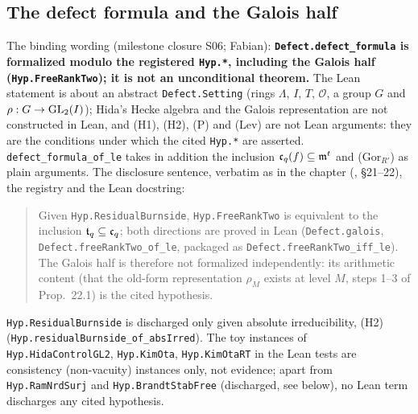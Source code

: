 \subsection{The defect formula and the Galois half}
The binding wording (milestone closure S06; Fabian): \textbf{\texttt{Defect.defect\_formula} is formalized modulo the
registered \texttt{Hyp.*}, including the Galois half (\texttt{Hyp.FreeRankTwo}); it is not an unconditional theorem.}
The Lean statement is about an abstract \texttt{Defect.Setting} (rings $\Lambda$, $I$, $T$, $\mathcal O$, a group $G$ and
$\rho:G\to\mathrm{GL}_2(I)$); Hida's Hecke algebra and the Galois representation are not constructed in Lean, and (H1), (H2), (P)
and (Lev) are not Lean arguments: they are the conditions under which the cited \texttt{Hyp.*} are asserted.
\texttt{defect\_formula\_of\_le} takes in addition the inclusion $\mathfrak{c}_q(f)\subseteq\mathfrak{m}^t$ and (Gor$_{R'}$) as plain arguments.
The disclosure sentence, verbatim as in the chapter (\mainpdf, \S21--22), the registry and the Lean docstring:
\begin{quote}\small
Given \texttt{Hyp.ResidualBurnside}, \texttt{Hyp.FreeRankTwo} is equivalent to the inclusion $\mathfrak{t}_q\subseteq\mathfrak{c}_q$; both
directions are proved in Lean (\texttt{Defect.galois}, \texttt{Defect.freeRankTwo\_of\_le}, packaged as
\texttt{Defect.freeRankTwo\_iff\_le}). The Galois half is therefore not formalized independently: its arithmetic content
(that the old-form representation $\rho_M$ exists at level $M$, steps 1--3 of Prop.~22.1) is the cited hypothesis.
\end{quote}
\texttt{Hyp.ResidualBurnside} is discharged only given absolute irreducibility, (H2)
(\texttt{Hyp.residualBurnside\_of\_absIrred}). The toy instances of \texttt{Hyp.HidaControlGL2}, \texttt{Hyp.KimOta},
\texttt{Hyp.KimOtaRT} in the Lean tests are consistency (non-vacuity) instances only, not evidence; apart from \texttt{Hyp.RamNrdSurj} and \texttt{Hyp.BrandtStabFree} (discharged, see
below), no Lean term discharges any cited hypothesis.

